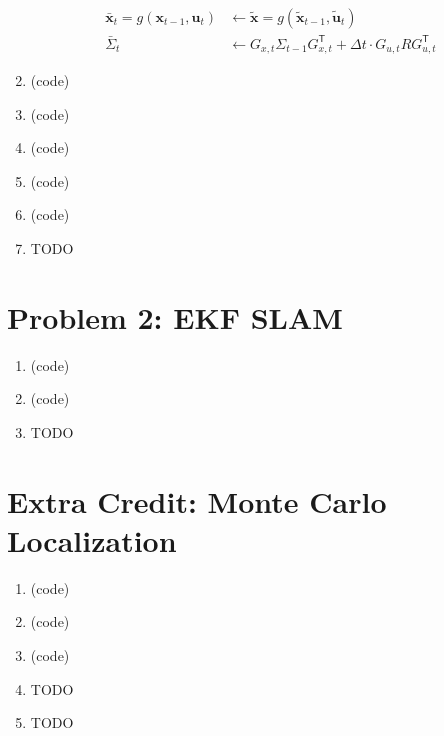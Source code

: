 \documentclass{article}
\begin{document}
\begin{enumerate}[label=(\roman*)]
\begin{equation}
\begin{aligned}
\bar{\mathbf{x}}_t = g(\mathbf{x}_{t-1}, \mathbf{u}_t) &\leftarrow \tilde{\mathbf{x}} = g(\tilde{\mathbf{x}}_{t-1}, \tilde{\mathbf{u}}_t) \\
\bar{\Sigma}_t &\leftarrow G_{x,t} \Sigma_{t-1} G_{x,t}^\mathsf{T} + \Delta t \cdot G_{u,t} R G_{u,t}^\mathsf{T}
\end{aligned}
\end{equation}

\item %
(code)

\item %
(code)

\item %
(code)

\item %
(code)

\item %
(code)

\item %
TODO

\end{enumerate}

\section*{Problem 2: EKF SLAM}
\begin{enumerate}[label=(\roman*)]
\item %
(code)

\item %
(code)

\item %
TODO

\end{enumerate}

\section*{Extra Credit: Monte Carlo Localization}
\begin{enumerate}[label=(\roman*)]
\item %
(code)

\item %
(code)

\item %
(code)

\item %
TODO

\item %
TODO

\end{enumerate}
\end{document}
